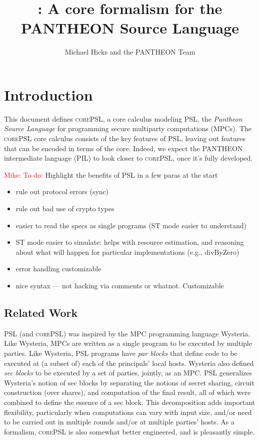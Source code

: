 \documentclass[10pt]{article}
\title{\lang: A core formalism for the PANTHEON Source Language}
\author{Michael Hicks and the PANTHEON Team}
\newcommand{\lang}{\textsc{corePSL}\xspace}
\newcommand{\mwh}[1]{\textcolor{red}{Mike: #1}}
\begin{document}
\maketitle

\section{Introduction}

This document defines \lang, a core calculus modeling PSL, the
\emph{Pantheon Source Language} for programming secure multiparty
computations (MPCs). The \lang core calculus consists of the key features of PSL,
leaving out features that can be encoded in terms of the core. Indeed,
we expect the PANTHEON intermediate language (PIL) to look closer to
\lang, once it's fully developed.

\mwh{To do:}
Highlight the benefits of PSL in a few paras at the start
\begin{itemize}
\item rule out protocol errors (sync)
\item rule out bad use of crypto types
\item easier to read the specs as single programs (ST mode easier to
  understand)
\item ST mode easier to simulate: helps with resource estimation, and
  reasoning about what will happen for particular implementations
  (e.g., divByZero)
\item error handling customizable
\item nice syntax — not hacking via comments or whatnot. Customizable
\end{itemize}

\subsection{Related Work}

PSL (and \lang) was inspired by the MPC programming language
Wysteria. Like Wysteria, MPCs are written as a single program to be
executed by multiple parties. Like Wysteria, PSL programs have
\emph{par blocks} that define code to be executed at (a subset of)
each of the principals' local hosts. Wysteria also defined \emph{sec
  blocks} to be executed by a set of parties, jointly, as an
MPC\@. PSL generalizes Wysteria's notion of sec blocks by separating
the notions of secret sharing, circuit construction (over shares), and
computation of the final result, all of which were combined to define
the essence of a sec block. This decomposition adds important
flexibility, particularly when computations can vary with input size,
and/or need to be carried out in multiple rounds and/or at multiple
parties' hosts. As a formalism, \lang is also somewhat better
engineered, and is pleasantly simple.
\end{document}
